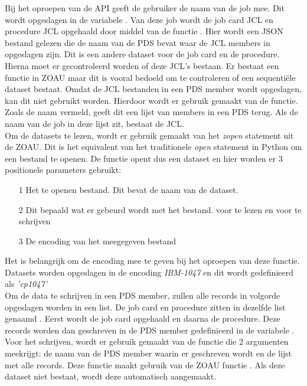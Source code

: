 \vspace{10 mm}
Bij het oproepen van de API geeft de gebruiker de naam van de job mee. Dit wordt opgeslagen in de variabele . Van deze job wordt de job card JCL en procedure JCL opgehaald door middel van de functie . Hier wordt een JSON bestand gelezen die de naam van de PDS bevat waar de JCL members in opgeslagen zijn. Dit is een andere dataset voor de job card en de procedure.\\

Hierna moet er gecontroleerd worden of deze JCL's bestaan. Er bestaat een  functie in ZOAU maar dit is vooral bedoeld om te controleren of een sequentiële dataset bestaat. Omdat de JCL bestanden in een PDS member wordt opgeslagen, kan dit niet gebruikt worden. Hierdoor wordt er gebruik gemaakt van de  functie. Zoals de naam vermeld, geeft dit een lijst van members in een PDS terug. Als de naam van de job in deze lijst zit, bestaat de JCL. \\
 
Om de datasets te lezen, wordt er gebruik gemaakt van het \textit{zopen} statement uit de ZOAU. Dit is het equivalent van het traditionele \textit{open} statement in Python om een bestand te openen. De  functie opent dus een dataset en hier worden er 3 positionele parameters gebruikt: 
\begin{itemize}
    \item[1] Het te openen bestand. Dit bevat de naam van de dataset.
    \item[2] Dit bepaald wat er gebeurd wordt met het bestand. \textit{} voor te lezen en \textit{} voor te schrijven
    \item[3] De encoding van het meegegeven bestand
\end{itemize} 
Het is belangrijk om de encoding mee te geven bij het oproepen van deze functie. Datasets worden opgeslagen in de encoding \textit{IBM-1047} en dit wordt gedefinieerd als \textit{'cp1047'} \\

Om de data te schrijven in een PDS member, zullen alle records in volgorde opgeslagen worden in een list. De job card en procedure zitten in dezelfde list genaamd . Eerst wordt de job card opgehaald en daarna de procedure. Deze records worden dan geschreven in de PDS member gedefinieerd in de variabele . Voor het schrijven, wordt er gebruik gemaakt van de functie  die 2 argumenten meekrijgt: de naam van de PDS member waarin er geschreven wordt en de lijst met alle records. Deze functie maakt gebruik van de ZOAU functie . Als deze dataset niet bestaat, wordt deze automatisch aangemaakt.


